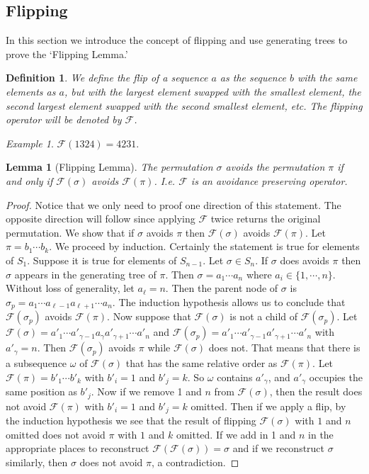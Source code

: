 \documentclass[11pt,letterpaper,twoside,english]{article}
\theoremstyle{theorem}
\newtheorem{lemma}[theorem]{Lemma}
\newtheorem{definition}[theorem]{Definition}
\theoremstyle{remark}
\newtheorem{example}{Example}
\begin{document}
\subsection{Flipping}
In this section we introduce the concept of flipping and use generating trees to prove the `Flipping Lemma.'
\begin{definition}
We define the \emph{flip} of a sequence $a$ as the sequence $b$ with the same elements as $a$, but with the largest element swapped with the smallest element, the second largest element swapped with the second smallest element, etc.  The flipping operator will be denoted by $\mathcal{F}$.  
\end{definition}

\begin{example}
$\mathcal{F}(1324)=4231$.
\end{example}

\begin{lemma}[Flipping Lemma]
The permutation $\sigma$ avoids the permutation $\pi$ if and only if $\mathcal{F}(\sigma)$ avoids $\mathcal{F}(\pi)$. I.e. $\mathcal{F}$ is an avoidance preserving operator. 
\end{lemma}
\begin{proof}
Notice that we only need to proof one direction of this statement. The opposite direction will follow since applying $\mathcal{F}$ twice returns the original permutation. We show that if ${\sigma}$ avoids $\pi$ then $\mathcal{F}(\sigma)$ avoids $\mathcal{F}(\pi)$. Let $\pi=b_1\cdots b_k$. We proceed by induction. Certainly the statement is true for elements of $S_1$. Suppose it is true for elements of $S_{n-1}$. Let $\sigma\in S_n$. If ${\sigma}$ does avoids $\pi$ then $\sigma$ appears in the generating tree of $\pi$.  Then $\sigma=a_1\cdots a_n$ where $a_i\in\{1,\cdots, n\}$. Without loss of generality, let $a_\ell=n$. Then the parent node of $\sigma$ is $\sigma_p=a_1\cdots a_{\ell-1} a_{\ell+1}\cdots a_n$. The induction hypothesis allows us to conclude that $\mathcal{F}(\sigma_p)$ avoids $\mathcal{F}(\pi)$. Now suppose that $\mathcal{F}(\sigma)$ is not a child of $\mathcal{F}(\sigma_p)$. Let $\mathcal{F}(\sigma)=a'_1\cdots a'_{\gamma-1} a_{\gamma}a'_{\gamma+1}\cdots a'_n$ and $\mathcal{F}(\sigma_p)=a'_1\cdots a'_{\gamma-1} a'_{\gamma+1}\cdots a'_n$ with $a'_\gamma=n$. Then $\mathcal{F}(\sigma_p)$ avoids $\pi$ while $\mathcal{F}(\sigma)$ does not. That means that there is a subsequence $\omega$ of $\mathcal{F}(\sigma)$ that has the same relative order as $\mathcal{F}(\pi)$. Let $\mathcal{F}(\pi)= b'_1\cdots b'_k$ with $b'_i=1$ and $b'_j=k$. So $\omega$ contains $a'_\gamma$, and $a'_\gamma$ occupies the same position as $b'_j$. Now if we remove 1 and $n$ from $\mathcal{F}(\sigma)$, then the result does not avoid $\mathcal{F}(\pi)$ with $b'_i=1$ and $b'_j=k$ omitted. Then if we apply a flip, by the induction hypothesis we see that the result of flipping $\mathcal{F}(\sigma)$ with $1$ and $n$ omitted does not avoid $\pi$ with $1$ and $k$ omitted. If we add in 1 and $n$ in the appropriate places to reconstruct $\mathcal{F}(\mathcal{F}(\sigma))=\sigma$ and if we reconstruct $\sigma$ similarly, then $\sigma$ does not avoid $\pi$, a contradiction. 
\end{proof}
\end{document}
